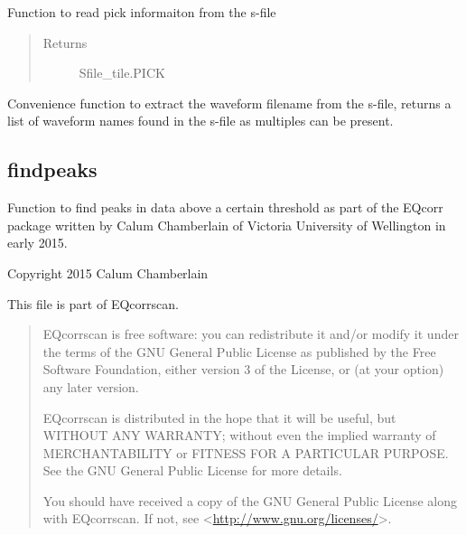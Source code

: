 \documentclass[a4paper,10pt,english]{sphinxmanual}
\begin{document}

\begin{fulllineitems}
\label{utils:Sfile_util.readpicks}
Function to read pick informaiton from the s-file
\begin{quote}\begin{description}
\item[{Returns}] \leavevmode
Sfile\_tile.PICK

\end{description}\end{quote}

\end{fulllineitems}


\begin{fulllineitems}
\label{utils:Sfile_util.readwavename}
Convenience function to extract the waveform filename from the s-file,
returns a list of waveform names found in the s-file as multiples can
be present.

\end{fulllineitems}



\subsection{findpeaks}
\label{utils:module-findpeaks}\label{utils:findpeaks}
Function to find peaks in data above a certain threshold as part of the EQcorr
package written by Calum Chamberlain of Victoria University of Wellington in
early 2015.

Copyright 2015 Calum Chamberlain

This file is part of EQcorrscan.
\begin{quote}

EQcorrscan is free software: you can redistribute it and/or modify
it under the terms of the GNU General Public License as published by
the Free Software Foundation, either version 3 of the License, or
(at your option) any later version.

EQcorrscan is distributed in the hope that it will be useful,
but WITHOUT ANY WARRANTY; without even the implied warranty of
MERCHANTABILITY or FITNESS FOR A PARTICULAR PURPOSE.  See the
GNU General Public License for more details.

You should have received a copy of the GNU General Public License
along with EQcorrscan.  If not, see \textless{}\href{http://www.gnu.org/licenses/}{http://www.gnu.org/licenses/}\textgreater{}.
\end{quote}
\end{document}
